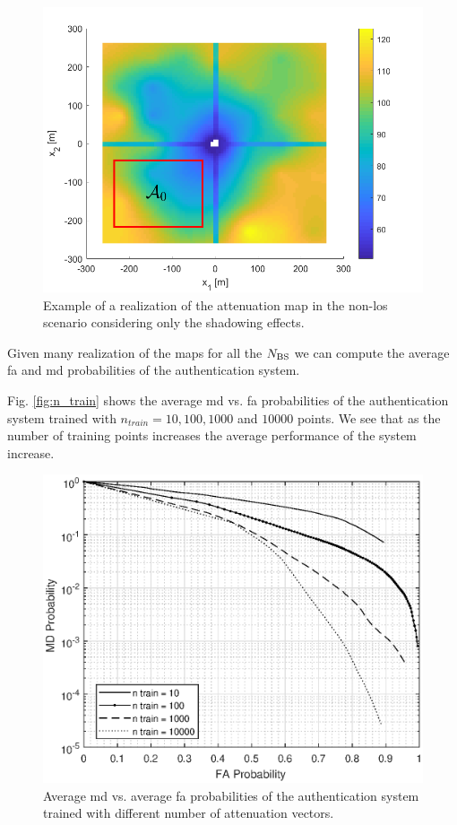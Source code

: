 \documentclass[twocolumns]{IEEEtran}
\begin{document}
\begin{figure}[h]
    \centering
    \includegraphics[width=1\columnwidth]{surfColorato.png}
    \caption{Example of a realization of the attenuation map in the non-\ac{los} scenario considering only the shadowing effects.}
    \label{fig:trueMap}
\end{figure}

Given many realization of the maps for all the $N_{\rm BS}$ we can compute the average \ac{fa} and \ac{md} probabilities of the authentication system.

Fig. \ref{fig:n_train} shows the average \ac{md} vs. \ac{fa} probabilities of the authentication system trained with $n_{train} = 10, 100, 1000$ and $10000$ points. We see that as the number of training points increases the average performance of the system increase. 

\begin{figure}[h]
    \centering
    \includegraphics[width=1\columnwidth]{mean_maps.eps}
    \caption{Average \ac{md} vs. average \ac{fa} probabilities of the authentication system trained with different number of attenuation vectors.}
    \label{fig:avgMap}
\end{figure}

\renewcommand*{\bibfont}{\footnotesize}

\printbibliography
\end{document}
